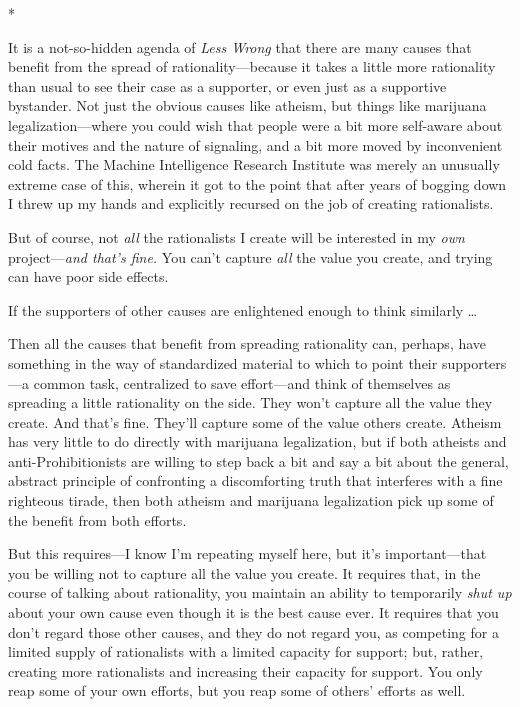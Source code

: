 {\centering
 *
\par}


{
 It is a not-so-hidden agenda of \textit{Less Wrong} that there are
many causes that benefit from the spread of rationality---because it
takes a little more rationality than usual to see their case as a
supporter, or even just as a supportive bystander. Not just the obvious
causes like atheism, but things like marijuana legalization---where you
could wish that people were a bit more self-aware about their motives
and the nature of signaling, and a bit more moved by inconvenient cold
facts. The Machine Intelligence Research Institute was merely an
unusually extreme case of this, wherein it got to the point that after
years of bogging down I threw up my hands and explicitly recursed on
the job of creating rationalists. }

{
 But of course, not \textit{all} the rationalists I create will be
interested in my \textit{own} project---\textit{and
that's fine.} You can't capture
\textit{all} the value you create, and trying can have poor side
effects.}

{
 If the supporters of other causes are enlightened enough to think
similarly \ldots}

{
 Then all the causes that benefit from spreading rationality can,
perhaps, have something in the way of standardized material to which to
point their supporters---a common task, centralized to save
effort---and think of themselves as spreading a little rationality on
the side. They won't capture all the value they create.
And that's fine. They'll capture some
of the value others create. Atheism has very little to do directly with
marijuana legalization, but if both atheists and anti-Prohibitionists
are willing to step back a bit and say a bit about the general,
abstract principle of confronting a discomforting truth that interferes
with a fine righteous tirade, then both atheism and marijuana
legalization pick up some of the benefit from both efforts.}

{
 But this requires---I know I'm repeating myself
here, but it's important---that you be willing not to
capture all the value you create. It requires that, in the course of
talking about rationality, you maintain an ability to temporarily
\textit{shut up} about your own cause even though it is the best cause
ever. It requires that you don't regard those other
causes, and they do not regard you, as competing for a limited supply
of rationalists with a limited capacity for support; but, rather,
creating more rationalists and increasing their capacity for support.
You only reap some of your own efforts, but you reap some of
others' efforts as well.}

